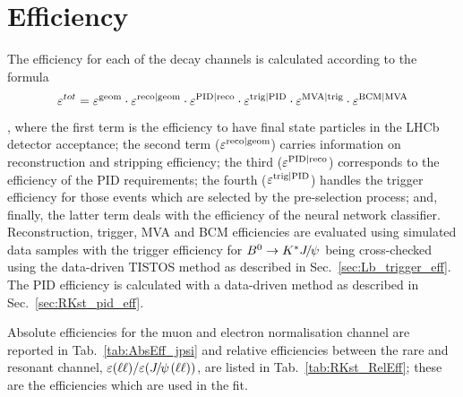 \section{Efficiency}
\label{sec:RKst_efficiency}

The efficiency for each of the decay channels is calculated according to the formula
%
$$\varepsilon^{tot} = \varepsilon^{\rm geom} \cdot \varepsilon^{\rm reco|geom} \cdot \varepsilon^{\rm PID|reco} \cdot \varepsilon^{\rm trig|PID} \cdot \varepsilon^{\rm MVA|trig}\cdot \varepsilon^{\rm BCM|MVA}$$,
%
where the first term is the efficiency to have final state particles in the LHCb detector 
acceptance; the second term ($\varepsilon^{\rm reco|geom}$) carries information on reconstruction and stripping efficiency;
the third ($\varepsilon^{\rm PID|reco}$) corresponds to the efficiency of the PID requirements;
the fourth ($\varepsilon^{\rm trig|PID}$) handles the trigger efficiency for those events which
are selected by the pre-selection process; and, finally, the latter term deals with the efficiency of the neural network classifier.
Reconstruction, trigger, MVA and BCM efficiencies are evaluated using simulated data samples with the trigger efficiency
for $\Bz\to\Kstar\jpsi$ being cross-checked using the data-driven TISTOS method as described in Sec.~\ref{sec:Lb_trigger_eff}.
The PID efficiency is calculated with a data-driven method as described in Sec.~\ref{sec:RKst_pid_eff}.

Absolute efficiencies for the muon and electron normalisation channel are reported in Tab.~\ref{tab:AbsEff_jpsi}
and relative efficiencies between the rare and resonant channel, 
$\varepsilon(\ell\ell)/\varepsilon(\jpsi(\ell\ell))$, are listed in Tab.~\ref{tab:RKst_RelEff};
these are the efficiencies which are used in the fit.

%
%
%
%

